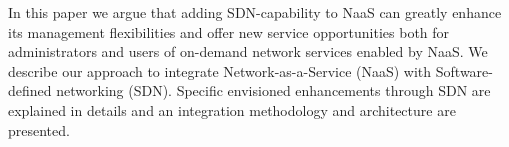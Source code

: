 In this paper we argue that adding SDN-capability to NaaS can greatly enhance
its management flexibilities and offer new service opportunities both for
administrators and users of on-demand network services enabled by NaaS. We
describe our approach to integrate Network-as-a-Service (NaaS) with
Software-defined networking (SDN). Specific envisioned
enhancements through SDN are explained in details and an integration
methodology and architecture are presented.

%
%
